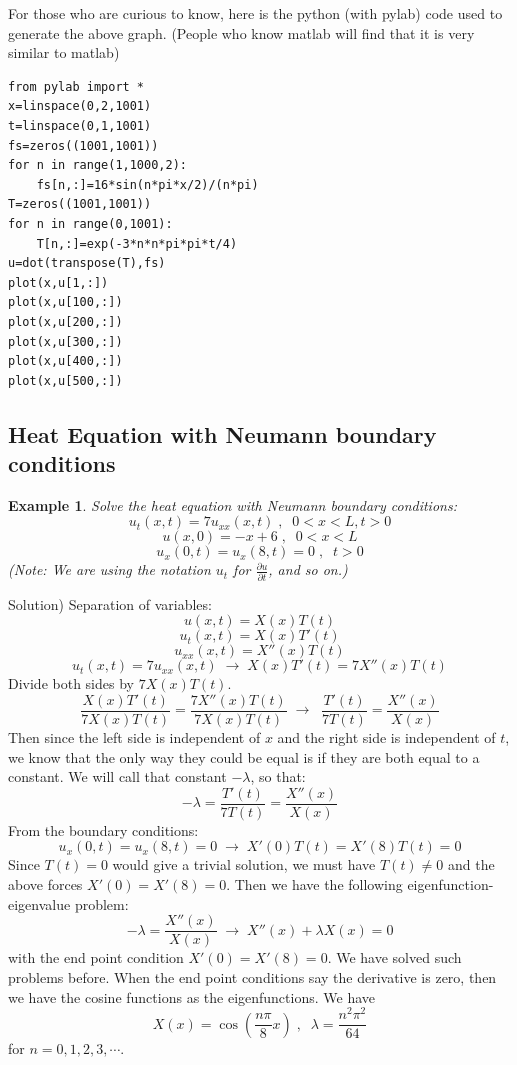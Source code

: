 \documentclass[12pt]{report}
\newtheorem{ex}{Example}[section]
\begin{document}
For those who are curious to know, here is the python (with pylab) code used to generate the above graph. (People who know matlab will find that it is very similar to matlab)

\begin{lstlisting}
from pylab import *
x=linspace(0,2,1001)
t=linspace(0,1,1001)
fs=zeros((1001,1001))
for n in range(1,1000,2):
	fs[n,:]=16*sin(n*pi*x/2)/(n*pi)
T=zeros((1001,1001))
for n in range(0,1001):
	T[n,:]=exp(-3*n*n*pi*pi*t/4)
u=dot(transpose(T),fs)
plot(x,u[1,:])
plot(x,u[100,:])
plot(x,u[200,:])
plot(x,u[300,:])
plot(x,u[400,:])
plot(x,u[500,:])
\end{lstlisting}


\subsection*{Heat Equation with Neumann boundary conditions }
\begin{ex} Solve the heat equation with Neumann boundary conditions:
$$u_t(x,t) = 7 u_{xx}(x,t)\; , \; \; 0<x<L, t>0$$
$$u(x,0)=-x+6  \; , \; \; 0<x<L$$
$$u_x(0,t)=u_x(8,t)=0 \; , \; \; t>0$$
(Note: We are using the notation $u_t$ for $\frac{\partial u}{\partial t}$, and so on.)
\end{ex}
Solution)
Separation of variables:
$$u(x,t)=X(x)T(t)$$
$$u_t(x,t) = X(x) T'(t)$$
$$u_{xx}(x,t) = X''(x) T(t)$$
$$u_t(x,t) = 7 u_{xx}(x,t)  \; \rightarrow \; X(x) T'(t) = 7 X''(x) T(t) $$
Divide both sides by $7X(x)T(t)$.
$$\frac{X(x) T'(t)}{7X(x)T(t)} = \frac{7 X''(x) T(t)}{7X(x)T(t)}  \; \rightarrow \; \; \frac{T'(t)}{7T(t)} = \frac{X''(x)}{X(x)} $$
Then since the left side is independent of $x$ and the right side is independent of $t$, we know that the only way they could be equal is if they are both equal to a constant. We will call that constant $-\lambda$, so that:
$$-\lambda=\frac{T'(t)}{7T(t)} = \frac{X''(x)}{X(x)} $$
From the boundary conditions:
$$u_x(0,t)=u_x(8,t)=0  \; \rightarrow \; X'(0)T(t)=X'(8)T(t)=0$$
Since $T(t)=0$ would give a trivial solution, we must have $T(t)\neq0$ and the above forces $X'(0)=X'(8)=0$.
Then we have the following eigenfunction-eigenvalue problem:
$$-\lambda = \frac{X''(x)}{X(x)}  \; \rightarrow \; X''(x) + \lambda X(x) =0$$
with the end point condition $X'(0)=X'(8)=0$. We have solved such problems before. When the end point conditions say the derivative is zero, then we have the cosine functions as the eigenfunctions. We have
$$X(x) = \cos \left( \frac{n \pi}{8} x \right)   \; , \; \; \lambda = \frac{n^2 \pi^2}{64} $$
for $n=0,1,2,3, \cdots $.
\end{document}
